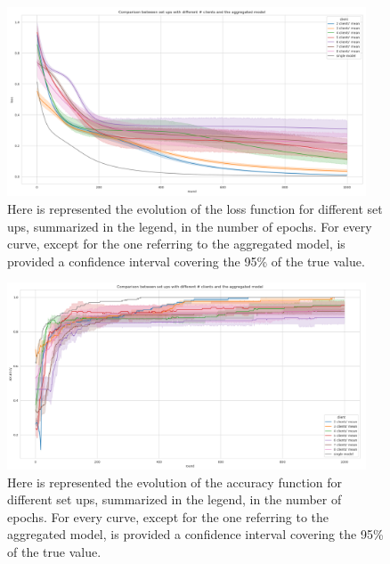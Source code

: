 \documentclass{article} %
\begin{document}
\begin{figure}[!hb]
    \centering
        \includegraphics[width=0.95\textwidth, keepaspectratio]{images/loss_red_same.png}
    \caption{Here is represented the evolution of the loss function for different set ups, 
        summarized in the legend, in the number of epochs. For every curve, except for the 
        one referring to the aggregated model, is provided a confidence interval covering the 
        95\% of the true value.}
    \label{fig3}
\end{figure}
\newpage
\begin{figure}[!ht]
    \centering
        \includegraphics[width=0.95\textwidth, keepaspectratio]{images/accuracy_red_same.png}
    \caption{Here is represented the evolution of the accuracy function for different set ups, 
        summarized in the legend, in the number of epochs. For every curve, except for the 
        one referring to the aggregated model, is provided a confidence interval covering the 
        95\% of the true value.}
    \label{fig4}
\end{figure}
\end{document}

